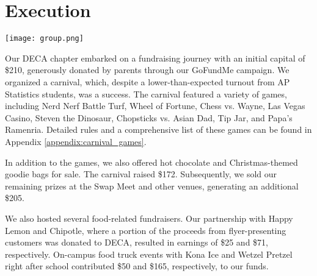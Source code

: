\section{Execution}

	\texttt{[image: group.png]}

Our DECA chapter embarked on a fundraising journey with an initial capital of \$210, generously donated by parents through our GoFundMe campaign. We organized a carnival, which, despite a lower-than-expected turnout from AP Statistics students, was a success. The carnival featured a variety of games, including Nerd Nerf Battle Turf, Wheel of Fortune, Chess vs. Wayne, Las Vegas Casino, Steven the Dinosaur, Chopsticks vs. Asian Dad, Tip Jar, and Papa's Ramenria. Detailed rules and a comprehensive list of these games can be found in Appendix \ref{appendix:carnival_games}.

In addition to the games, we also offered hot chocolate and Christmas-themed goodie bags for sale. The carnival raised \$172. Subsequently, we sold our remaining prizes at the Swap Meet and other venues, generating an additional \$205.

We also hosted several food-related fundraisers. Our partnership with Happy Lemon and Chipotle, where a portion of the proceeds from flyer-presenting customers was donated to DECA, resulted in earnings of \$25 and \$71, respectively. On-campus food truck events with Kona Ice and Wetzel Pretzel right after school contributed \$50 and \$165, respectively, to our funds.


